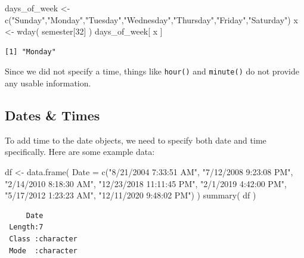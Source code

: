 \documentclass[
  letterpaper,
]{book}
\newenvironment{Shaded}{\begin{snugshade}}{\end{snugshade}}
\newcommand{\AttributeTok}[1]{\textcolor[rgb]{0.40,0.45,0.13}{#1}}
\newcommand{\DecValTok}[1]{\textcolor[rgb]{0.68,0.00,0.00}{#1}}
\newcommand{\FunctionTok}[1]{\textcolor[rgb]{0.28,0.35,0.67}{#1}}
\newcommand{\NormalTok}[1]{\textcolor[rgb]{0.00,0.23,0.31}{#1}}
\newcommand{\OtherTok}[1]{\textcolor[rgb]{0.00,0.23,0.31}{#1}}
\newcommand{\StringTok}[1]{\textcolor[rgb]{0.13,0.47,0.30}{#1}}
\begin{document}
\begin{Shaded}
\begin{Highlighting}[]
\NormalTok{days\_of\_week }\OtherTok{\textless{}{-}} \FunctionTok{c}\NormalTok{(}\StringTok{"Sunday"}\NormalTok{,}\StringTok{"Monday"}\NormalTok{,}\StringTok{"Tuesday"}\NormalTok{,}\StringTok{"Wednesday"}\NormalTok{,}\StringTok{"Thursday"}\NormalTok{,}\StringTok{"Friday"}\NormalTok{,}\StringTok{"Saturday"}\NormalTok{)}
\NormalTok{x }\OtherTok{\textless{}{-}} \FunctionTok{wday}\NormalTok{( semester[}\DecValTok{32}\NormalTok{] )}
\NormalTok{days\_of\_week[ x ]}
\end{Highlighting}
\end{Shaded}

\begin{verbatim}
[1] "Monday"
\end{verbatim}

Since we did not specify a time, things like \texttt{hour()} and
\texttt{minute()} do not provide any usable information.

\subsection{Dates \& Times}\label{dates-times}

To add time to the date objects, we need to specify both date and time
specifically. Here are some example data:

\begin{Shaded}
\begin{Highlighting}[]
\NormalTok{df }\OtherTok{\textless{}{-}} \FunctionTok{data.frame}\NormalTok{( }\AttributeTok{Date =} \FunctionTok{c}\NormalTok{(}\StringTok{"8/21/2004 7:33:51 AM"}\NormalTok{,}
                           \StringTok{"7/12/2008 9:23:08 PM"}\NormalTok{,}
                           \StringTok{"2/14/2010 8:18:30 AM"}\NormalTok{,}
                           \StringTok{"12/23/2018 11:11:45 PM"}\NormalTok{,}
                           \StringTok{"2/1/2019 4:42:00 PM"}\NormalTok{,}
                           \StringTok{"5/17/2012 1:23:23 AM"}\NormalTok{,}
                           \StringTok{"12/11/2020 9:48:02 PM"}\NormalTok{) )}
\FunctionTok{summary}\NormalTok{( df )}
\end{Highlighting}
\end{Shaded}

\begin{verbatim}
     Date          
 Length:7          
 Class :character  
 Mode  :character  
\end{verbatim}
\end{document}
